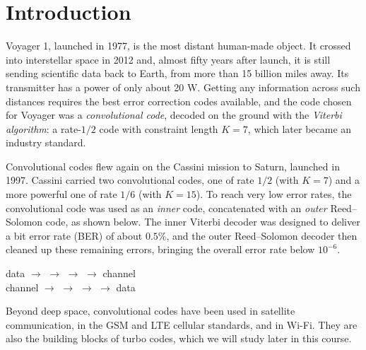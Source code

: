 \Contributor{}

\lstset{style=mystyle}

	\MakeScribeTop


\section{Introduction}

Voyager 1, launched in 1977, is the most distant human-made object. It crossed into interstellar space in 2012 and, almost fifty years after launch, it is still sending scientific data back to Earth, from more than 15 billion miles away. Its transmitter has a power of only about 20 W. Getting any information across such distances requires the best error correction codes available, and the code chosen for Voyager was a \emph{convolutional code}, decoded on the ground with the \emph{Viterbi algorithm}: a rate-\(1/2\) code with constraint length \(K = 7\), which later became an industry standard.

Convolutional codes flew again on the Cassini mission to Saturn, launched in 1997. Cassini carried two convolutional codes, one of rate \(1/2\) (with \(K = 7\)) and a more powerful one of rate \(1/6\) (with \(K = 15\)). To reach very low error rates, the convolutional code was used as an \emph{inner} code, concatenated with an \emph{outer} Reed--Solomon code, as shown below. The inner Viterbi decoder was designed to deliver a bit error rate (BER) of about \(0.5\%\), and the outer Reed--Solomon decoder then cleaned up these remaining errors, bringing the overall error rate below \(10^{-6}\).
\begin{center}
\small
data \(\to\)  \(\to\)  \(\to\)  \(\to\) channel \\[4pt]
channel \(\to\)  \(\to\)  \(\to\)  \(\to\) data
\end{center}

Beyond deep space, convolutional codes have been used in satellite communication, in the GSM and LTE cellular standards, and in Wi-Fi. They are also the building blocks of turbo codes, which we will study later in this course.

